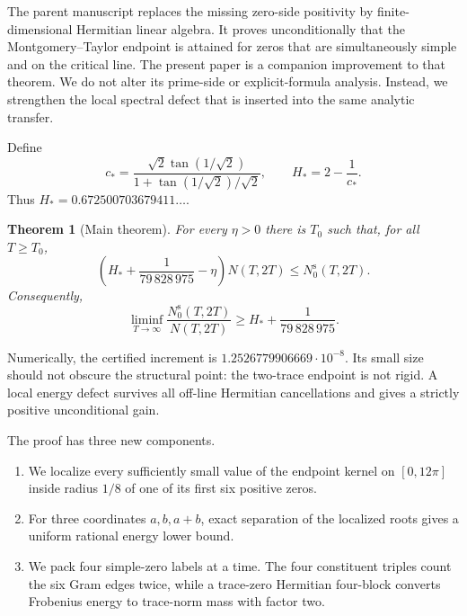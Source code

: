 \documentclass[11pt,reqno]{amsart}
\newtheorem{theorem}{Theorem}[section]
\theoremstyle{definition}
\theoremstyle{remark}
\begin{document}
The parent manuscript \cite{Claude2026} replaces the missing zero-side
positivity by finite-dimensional Hermitian linear algebra.  It proves
unconditionally that the Montgomery--Taylor endpoint is attained for zeros
that are simultaneously simple and on the critical line.  The present paper
is a companion improvement to that theorem.  We do not alter its prime-side
or explicit-formula analysis.  Instead, we strengthen the local spectral
defect that is inserted into the same analytic transfer.

Define
\begin{equation}\label{eq:cstar}
 c_*=
 \frac{\sqrt2\tan(1/\sqrt2)}{1+\tan(1/\sqrt2)/\sqrt2},
 \qquad H_*=2-\frac1{c_*}.
\end{equation}
Thus $H_*=0.672500703679411\ldots$.

\begin{theorem}[Main theorem]\label{thm:main}
For every $\eta>0$ there is $T_0$ such that, for all $T\ge T_0$,
\begin{equation}\label{eq:main-epsilon}
 \left(H_*+\frac1{79\,828\,975}-\eta\right)N(T,2T)
 \le N_0^{\mathrm{s}}(T,2T).
\end{equation}
Consequently,
\begin{equation}\label{eq:main-liminf}
 \liminf_{T\to\infty}
 \frac{N_0^{\mathrm{s}}(T,2T)}{N(T,2T)}
 \ge H_*+\frac1{79\,828\,975}.
\end{equation}
\end{theorem}

Numerically, the certified increment is
$1.2526779906669\cdot10^{-8}$.  Its small size should not obscure the
structural point: the two-trace endpoint is not rigid.  A local energy defect
survives all off-line Hermitian cancellations and gives a strictly positive
unconditional gain.

The proof has three new components.
\begin{enumerate}[label=(\roman*)]
\item We localize every sufficiently small value of the endpoint kernel on
      $[0,12\pi]$ inside radius $1/8$ of one of its first six positive zeros.
\item For three coordinates $a,b,a+b$, exact separation of the localized
      roots gives a uniform rational energy lower bound.
\item We pack four simple-zero labels at a time.  The four constituent
      triples count the six Gram edges twice, while a trace-zero Hermitian
      four-block converts Frobenius energy to trace-norm mass with factor two.
\end{enumerate}
\end{document}
